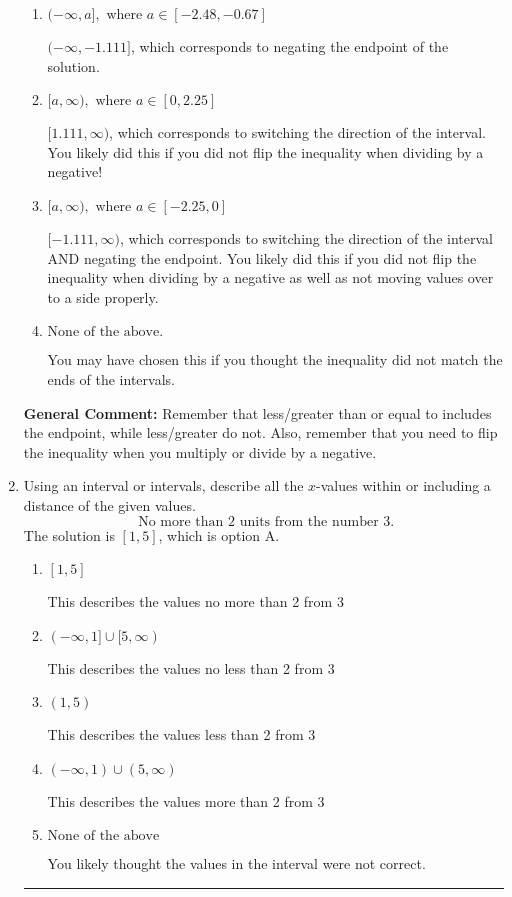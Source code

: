 \documentclass{extbook}[14pt]
\newcommand{\litem}[1]{\item #1

\rule{\textwidth}{0.4pt}}
\begin{document}
\begin{enumerate}
{\begin{enumerate}[label=\Alph*.]
* $(-\infty, 1.111]$, which is the correct option.
\item \( (-\infty, a], \text{ where } a \in [-2.48, -0.67] \)

 $(-\infty, -1.111]$, which corresponds to negating the endpoint of the solution.
\item \( [a, \infty), \text{ where } a \in [0, 2.25] \)

 $[1.111, \infty)$, which corresponds to switching the direction of the interval. You likely did this if you did not flip the inequality when dividing by a negative!
\item \( [a, \infty), \text{ where } a \in [-2.25, 0] \)

 $[-1.111, \infty)$, which corresponds to switching the direction of the interval AND negating the endpoint. You likely did this if you did not flip the inequality when dividing by a negative as well as not moving values over to a side properly.
\item \( \text{None of the above}. \)

You may have chosen this if you thought the inequality did not match the ends of the intervals.
\end{enumerate}

\textbf{General Comment:} Remember that less/greater than or equal to includes the endpoint, while less/greater do not. Also, remember that you need to flip the inequality when you multiply or divide by a negative.
}
\litem{
Using an interval or intervals, describe all the $x$-values within or including a distance of the given values.
\[ \text{ No more than } 2 \text{ units from the number } 3. \]The solution is \( [1, 5] \), which is option A.\begin{enumerate}[label=\Alph*.]
\item \( [1, 5] \)

This describes the values no more than 2 from 3
\item \( (-\infty, 1] \cup [5, \infty) \)

This describes the values no less than 2 from 3
\item \( (1, 5) \)

This describes the values less than 2 from 3
\item \( (-\infty, 1) \cup (5, \infty) \)

This describes the values more than 2 from 3
\item \( \text{None of the above} \)

You likely thought the values in the interval were not correct.
\end{enumerate}

}
\end{enumerate}
\end{document}
